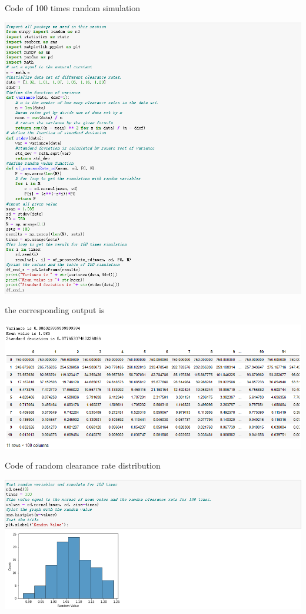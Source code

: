\documentclass{article}
\begin{document}
Code of 100 times random simulation\\
\begin{center}
    \includegraphics[scale = 0.65]{Codeof100simulation.png}
\end{center}
the corresponding output is\\
\begin{center}
    \includegraphics[scale = 0.6]{Corresponding out put of 100 simu.png}
\end{center}
Code of random clearance rate distribution\\
\begin{center}
    \includegraphics[scale = 0.6]{CodeOfRandomValue.png}
\end{center}
\end{document}

